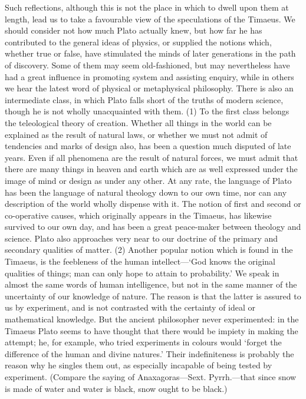 \documentclass[11pt,letter]{article}
\begin{document}
\par  Such reflections, although this is not the place in which to dwell upon them at length, lead us to take a favourable view of the speculations of the Timaeus. We should consider not how much Plato actually knew, but how far he has contributed to the general ideas of physics, or supplied the notions which, whether true or false, have stimulated the minds of later generations in the path of discovery. Some of them may seem old-fashioned, but may nevertheless have had a great influence in promoting system and assisting enquiry, while in others we hear the latest word of physical or metaphysical philosophy. There is also an intermediate class, in which Plato falls short of the truths of modern science, though he is not wholly unacquainted with them. (1) To the first class belongs the teleological theory of creation. Whether all things in the world can be explained as the result of natural laws, or whether we must not admit of tendencies and marks of design also, has been a question much disputed of late years. Even if all phenomena are the result of natural forces, we must admit that there are many things in heaven and earth which are as well expressed under the image of mind or design as under any other. At any rate, the language of Plato has been the language of natural theology down to our own time, nor can any description of the world wholly dispense with it. The notion of first and second or co-operative causes, which originally appears in the Timaeus, has likewise survived to our own day, and has been a great peace-maker between theology and science. Plato also approaches very near to our doctrine of the primary and secondary qualities of matter. (2) Another popular notion which is found in the Timaeus, is the feebleness of the human intellect—‘God knows the original qualities of things; man can only hope to attain to probability.’ We speak in almost the same words of human intelligence, but not in the same manner of the uncertainty of our knowledge of nature. The reason is that the latter is assured to us by experiment, and is not contrasted with the certainty of ideal or mathematical knowledge. But the ancient philosopher never experimented: in the Timaeus Plato seems to have thought that there would be impiety in making the attempt; he, for example, who tried experiments in colours would ‘forget the difference of the human and divine natures.’ Their indefiniteness is probably the reason why he singles them out, as especially incapable of being tested by experiment. (Compare the saying of Anaxagoras—Sext. Pyrrh.—that since snow is made of water and water is black, snow ought to be black.)
\end{document}
